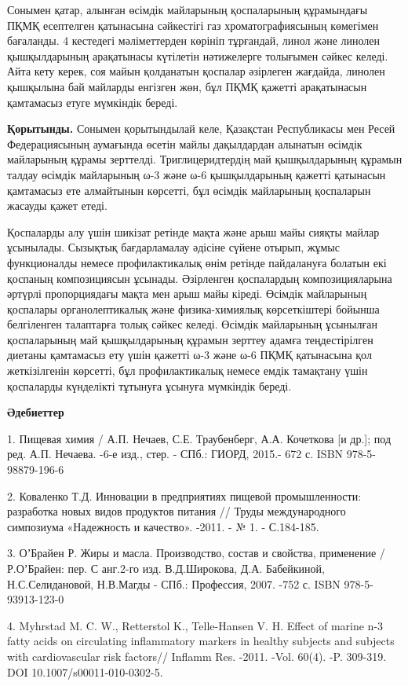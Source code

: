 Сонымен қатар, алынған өсімдік майларының қоспаларының құрамындағы ПҚМҚ
есептелген қатынасына сәйкестігі газ хроматографиясының көмегімен
бағаланды. 4 кестедегі мәліметтерден көрініп тұрғандай, линол және
линолен қышқылдарының арақатынасы күтілетін нәтижелерге толығымен сәйкес
келеді. Айта кету керек, соя майын қолданатын қоспалар әзірлеген
жағдайда, линолен қышқылына бай майларды енгізген жөн, бұл ПҚМҚ қажетті
арақатынасын қамтамасыз етуге мүмкіндік береді.

{\bfseries Қорытынды.} Сонымен қорытындылай келе, Қазақстан Республикасы
мен Ресей Федерациясының аумағында өсетін майлы дақылдардан алынатын
өсімдік майларының құрамы зерттелді. Триглицеридтердің май қышқылдарының
құрамын талдау өсімдік майларының ω-3 және ω-6 қышқылдарының қажетті
қатынасын қамтамасыз ете алмайтынын көрсетті, бұл өсімдік майларының
қоспаларын жасауды қажет етеді.

Қоспаларды алу үшін шикізат ретінде мақта және арыш майы сияқты майлар
ұсынылады. Сызықтық бағдарламалау әдісіне сүйене отырып, жұмыс
функционалды немесе профилактикалық өнім ретінде пайдалануға болатын екі
қоспаның композициясын ұсынады. Әзірленген қоспалардың композицияларына
әртүрлі пропорциядағы мақта мен арыш майы кіреді. Өсімдік майларының
қоспалары органолептикалық және физика-химиялық көрсеткіштері бойынша
белгіленген талаптарға толық сәйкес келеді. Өсімдік майларының ұсынылған
қоспаларының май қышқылдарының құрамын зерттеу адамға теңдестірілген
диетаны қамтамасыз ету үшін қажетті ω-3 және ω-6 ПҚМҚ қатынасына қол
жеткізілгенін көрсетті, бұл профилактикалық немесе емдік тамақтану үшін
қоспаларды күнделікті тұтынуға ұсынуға мүмкіндік береді.

{\bfseries Әдебиеттер}

1. Пищевая химия / А.П. Нечаев, С.Е. Траубенберг, А.А. Кочеткова {[}и
др.{]}; под ред. А.П. Нечаева. -6-е изд., стер. - СПб.: ГИОРД, 2015.-
672 с. ISBN 978-5-98879-196-6

2. Коваленко Т.Д. Инновации в предприятиях пищевой промышленности:
разработка новых видов продуктов питания // Труды международного
симпозиума «Надежность и качество». -2011. - № 1. - С.184-185.

3. ОʼБрайен Р. Жиры и масла. Производство, состав и свойства, применение
/ Р.ОʼБрайен: пер. С анг.2-го изд. В.Д.Широкова, Д.А. Бабейкиной,
Н.С.Селидановой, Н.В.Магды - СПб.: Профессия, 2007. -752 с. ISBN
978-5-93913-123-0

4. Myhrstad M. C. W., Retterstol K., Telle-Hansen V. H. Effect of marine
n-3 fatty acids on circulating inflammatory markers in healthy subjects
and subjects with cardiovascular risk factors// Inflamm Res. -2011.
-Vol. 60(4). -P. 309-319. DOI 10.1007/s00011-010-0302-5.

